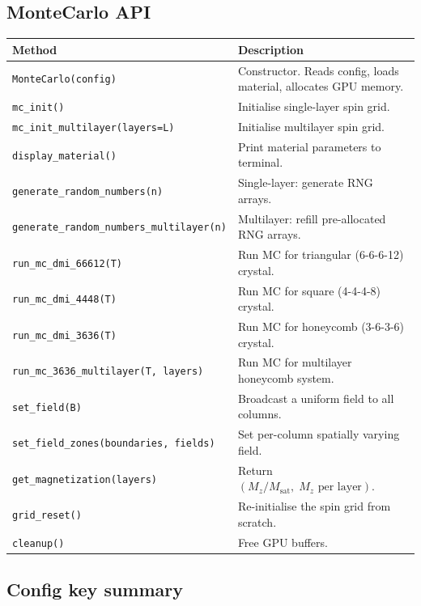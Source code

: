\documentclass[12pt,a4paper]{article}
\newcommand{\code}[1]{\texttt{#1}}
\begin{document}
\subsection{MonteCarlo API}

\begin{center}
\begin{longtable}{lp{10cm}}
\toprule
\textbf{Method} & \textbf{Description} \\
\midrule
\endhead
\code{MonteCarlo(config)} & Constructor. Reads config, loads material, allocates GPU memory. \\
\code{mc\_init()} & Initialise single-layer spin grid. \\
\code{mc\_init\_multilayer(layers=L)} & Initialise multilayer spin grid. \\
\code{display\_material()} & Print material parameters to terminal. \\
\code{generate\_random\_numbers(n)} & Single-layer: generate RNG arrays. \\
\code{generate\_random\_numbers\_multilayer(n)} & Multilayer: refill pre-allocated RNG arrays. \\
\code{run\_mc\_dmi\_66612(T)} & Run MC for triangular (6-6-6-12) crystal. \\
\code{run\_mc\_dmi\_4448(T)} & Run MC for square (4-4-4-8) crystal. \\
\code{run\_mc\_dmi\_3636(T)} & Run MC for honeycomb (3-6-3-6) crystal. \\
\code{run\_mc\_3636\_multilayer(T, layers)} & Run MC for multilayer honeycomb system. \\
\code{set\_field(B)} & Broadcast a uniform field to all columns. \\
\code{set\_field\_zones(boundaries, fields)} & Set per-column spatially varying field. \\
\code{get\_magnetization(layers)} & Return $(M_z/M_\text{sat},\; M_z\text{ per layer})$. \\
\code{grid\_reset()} & Re-initialise the spin grid from scratch. \\
\code{cleanup()} & Free GPU buffers. \\
\bottomrule
\end{longtable}
\end{center}

\subsection{Config key summary}
\end{document}
